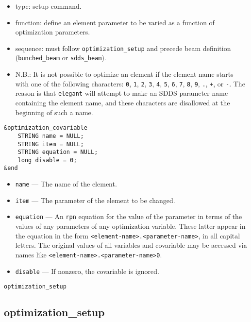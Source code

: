 \documentclass[11pt]{article}
\begin{document}
\begin{itemize}
\item type: setup command.
\item function: define an element parameter to be varied as a function of optimization parameters.
\item sequence: must follow \verb|optimization_setup| and precede beam definition (\verb|bunched_beam| or \verb|sdds_beam|).
\item N.B.: It is not possible to optimize an element if the element name starts with one of the following
characters: 
\verb|0|, \verb|1|, \verb|2|, \verb|3|, \verb|4|, \verb|5|, \verb|6|, \verb|7|, \verb|8|,
\verb|9|, \verb|.|, \verb|+|, or \verb|-|.  The reason is that {\tt elegant} will attempt to 
make an SDDS parameter name containing the element name, and these characters are disallowed
at the beginning of such a name.
\end{itemize}

\begin{verbatim}
&optimization_covariable
    STRING name = NULL;
    STRING item = NULL;
    STRING equation = NULL;
    long disable = 0;
&end
\end{verbatim}

\begin{itemize}
\item \verb|name| --- The name of the element.
\item \verb|item| --- The parameter of the element to be changed.
\item \verb|equation| --- An {\tt rpn} equation for the value of the parameter in terms of the
values of any parameters of any optimization variable.  These latter appear in the equation in the
form \verb|<element-name>.<parameter-name>|, in all capital letters.  The original values of all
variables and covariable may be accessed via names like \verb|<element-name>.<parameter-name>0|.
\item \verb|disable| --- If nonzero, the covariable is ignored.
\end{itemize}

\newpage
\begin{center}{\Large\verb|optimization_setup|}\end{center}
\subsection{optimization\_setup \label{subsec:optimizationsetup}}
\end{document}
